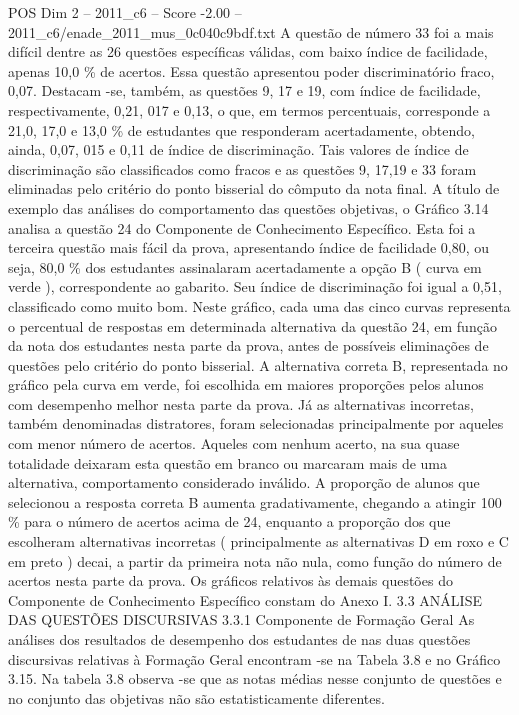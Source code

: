 \begin{textsample}{POS Dim 2 – 2011\_c6 – Score -2.00 – 2011\_c6/enade\_2011\_mus\_0c040c9bdf.txt}
A questão de número 33 foi a mais difícil dentre as 26 questões específicas válidas, com baixo índice de facilidade, apenas 10,0 \% de acertos.
Essa questão apresentou poder discriminatório fraco, 0,07.
Destacam -se, também, as questões 9, 17 e 19, com índice de facilidade, respectivamente, 0,21, 017 e 0,13, o que, em termos percentuais, corresponde a 21,0, 17,0 e 13,0 \% de estudantes que responderam acertadamente, obtendo, ainda, 0,07, 015 e 0,11 de índice de discriminação.
Tais valores de índice de discriminação são classificados como fracos e as questões 9, 17,19 e 33 foram eliminadas pelo critério do ponto bisserial do cômputo da nota final.
A título de exemplo das análises do comportamento das questões objetivas, o Gráfico 3.14 analisa a questão 24 do Componente de Conhecimento Específico.
Esta foi a terceira questão mais fácil da prova, apresentando índice de facilidade 0,80, ou seja, 80,0 \% dos estudantes assinalaram acertadamente a opção B ( curva em verde ), correspondente ao gabarito.
Seu índice de discriminação foi igual a 0,51, classificado como muito bom.
Neste gráfico, cada uma das cinco curvas representa o percentual de respostas em determinada alternativa da questão 24, em função da nota dos estudantes nesta parte da prova, antes de possíveis eliminações de questões pelo critério do ponto bisserial.
A alternativa correta B, representada no gráfico pela curva em verde, foi escolhida em maiores proporções pelos alunos com desempenho melhor nesta parte da prova.
Já as alternativas incorretas, também denominadas distratores, foram selecionadas principalmente por aqueles com menor número de acertos.
Aqueles com nenhum acerto, na sua quase totalidade deixaram esta questão em branco ou marcaram mais de uma alternativa, comportamento considerado inválido.
A proporção de alunos que selecionou a resposta correta B aumenta gradativamente, chegando a atingir 100 \% para o número de acertos acima de 24, enquanto a proporção dos que escolheram alternativas incorretas ( principalmente as alternativas D em roxo e C em preto ) decai, a partir da primeira nota não nula, como função do número de acertos nesta parte da prova.
Os gráficos relativos às demais questões do Componente de Conhecimento Específico constam do Anexo I. 3.3 ANÁLISE DAS QUESTÕES DISCURSIVAS 3.3.1 Componente de Formação Geral As análises dos resultados de desempenho dos estudantes de nas duas questões discursivas relativas à Formação Geral encontram -se na Tabela 3.8 e no Gráfico 3.15.
Na tabela 3.8 observa -se que as notas médias nesse conjunto de questões e no conjunto das objetivas não são estatisticamente diferentes.

\end{textsample}

